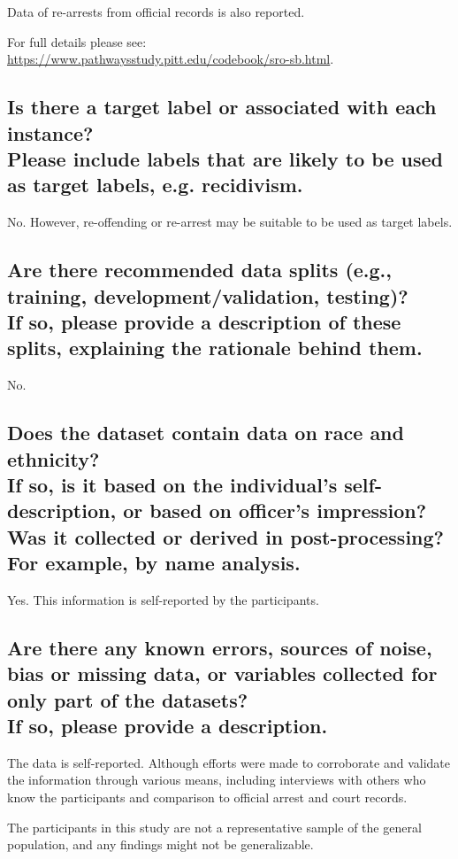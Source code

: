 \documentclass[letterpaper, 10 pt, conference]{ieeeconf}  %
\newcommand{\subtitle}[1]{{\\ \small \normalfont \color{purple} #1}}
\begin{document}
Data of re-arrests from official records is also reported. 

For full details please see: \\
\href{https://www.pathwaysstudy.pitt.edu/codebook/sro-sb.html}{https://www.pathwaysstudy.pitt.edu/codebook/sro-sb.html}.


\subsection{Is there a target label or associated with each instance? \subtitle{Please include labels that are likely to be used as target labels, e.g. recidivism.}}

No. However, re-offending or re-arrest may be suitable to be used as target labels. 

\subsection{Are there recommended data splits (e.g., training, development/validation, testing)? \subtitle{If so, please provide a description of these splits, explaining the rationale behind them.}}

No.

\subsection{Does the dataset contain data on race and ethnicity? \subtitle{If so, is it based on the individual's self-description, or based on officer's impression? Was it collected or derived in post-processing? For example, by name analysis.}}

Yes. This information is self-reported by the participants. 

\subsection{Are there any known errors, sources of noise, bias or missing data, or variables collected for only part of the datasets? \subtitle{If so, please provide a description.}}

The data is self-reported. Although efforts were made to corroborate and validate the information through various means, including interviews with others who know the participants and comparison to official arrest and court records.

The participants in this study are not a representative sample of the general population, and any findings might not be generalizable.  
\end{document}
